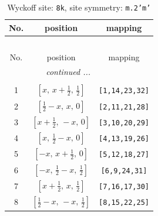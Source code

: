 \documentclass[fleqn,8pt]{jsarticle}
\begin{document}
\begin{longtable}{ccc}
\caption{Wyckoff site: {\tt 8k}, site symmetry: {\tt m.2'm'}}
 \\
 \hline \hline
No. & position & mapping \\ \hline \endfirsthead

\multicolumn{2}{l}{\tablename\ \thetable{}} \\
 \hline \hline
No. & position & mapping \\ \hline \endhead

 \hline \hline
\multicolumn{2}{r}{\footnotesize\it continued ...} \\ \endfoot

 \hline \hline
\multicolumn{2}{r}{} \\ \endlastfoot

1 & $\left[ x,\, x + \frac{1}{2},\, \frac{1}{2} \right]$ & {\tt [1,14,23,32]} \\ \hline
2 & $\left[ \frac{1}{2} - x,\, x,\, 0 \right]$ & {\tt [2,11,21,28]} \\ \hline
3 & $\left[ x + \frac{1}{2},\, - x,\, 0 \right]$ & {\tt [3,10,20,29]} \\ \hline
4 & $\left[ x,\, \frac{1}{2} - x,\, 0 \right]$ & {\tt [4,13,19,26]} \\ \hline
5 & $\left[ - x,\, x + \frac{1}{2},\, 0 \right]$ & {\tt [5,12,18,27]} \\ \hline
6 & $\left[ - x,\, \frac{1}{2} - x,\, \frac{1}{2} \right]$ & {\tt [6,9,24,31]} \\ \hline
7 & $\left[ x + \frac{1}{2},\, x,\, \frac{1}{2} \right]$ & {\tt [7,16,17,30]} \\ \hline
8 & $\left[ \frac{1}{2} - x,\, - x,\, \frac{1}{2} \right]$ & {\tt [8,15,22,25]} \\
\end{longtable}
\renewcommand{\arraystretch}{1.2}
\end{document}
